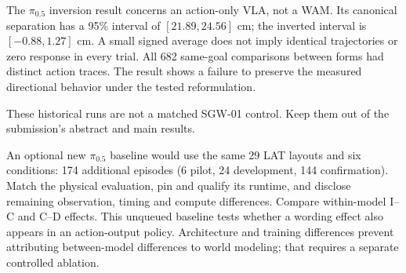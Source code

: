 \documentclass[11pt]{article}
\begin{document}
The $\pi_{0.5}$ inversion result concerns an action-only VLA, not a WAM. Its canonical separation has a 95\% interval of $[21.89,24.56]$ cm; the inverted interval is $[-0.88,1.27]$ cm. A small signed average does not imply identical trajectories or zero response in every trial. All 682 same-goal comparisons between forms had distinct action traces. The result shows a failure to preserve the measured directional behavior under the tested reformulation.

These historical runs are not a matched SGW-01 control. Keep them out of the submission's abstract and main results.

An optional new $\pi_{0.5}$ baseline would use the same 29 LAT layouts and six conditions: 174 additional episodes (6 pilot, 24 development, 144 confirmation). Match the physical evaluation, pin and qualify its runtime, and disclose remaining observation, timing and compute differences. Compare within-model I--C and C--D effects. This unqueued baseline tests whether a wording effect also appears in an action-output policy. Architecture and training differences prevent attributing between-model differences to world modeling; that requires a separate controlled ablation.
\end{document}
